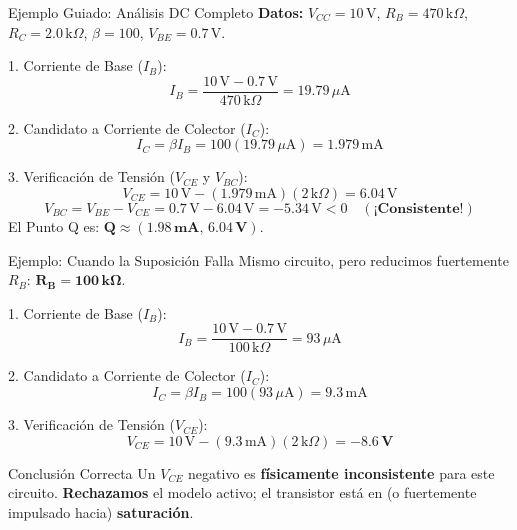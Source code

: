 \documentclass[aspectratio=169, table, xcdraw]{beamer}
\begin{document}
\begin{frame}{Ejemplo Guiado: Análisis DC Completo}
    \textbf{Datos:} $V_{CC}=10\,\text{V}$, $R_B=470\,\text{k}\Omega$, $R_C=2.0\,\text{k}\Omega$, $\beta=100$, $V_{BE}=0.7\,\text{V}$.
    
    \vspace{0.2cm}
    1. Corriente de Base ($I_B$):
    \begin{equation*}
        I_B = \frac{10\,\text{V} - 0.7\,\text{V}}{470\,\text{k}\Omega} = 19.79\,\mu\text{A}
    \end{equation*}
    
    2. Candidato a Corriente de Colector ($I_C$):
    \begin{equation*}
        I_C = \beta I_B = 100(19.79\,\mu\text{A}) = 1.979\,\text{mA}
    \end{equation*}
    
    3. Verificación de Tensión ($V_{CE}$ y $V_{BC}$):
    \begin{equation*}
        V_{CE} = 10\,\text{V} - (1.979\,\text{mA})(2\,\text{k}\Omega) = 6.04\,\text{V}
    \end{equation*}
    \begin{equation*}
        V_{BC} = V_{BE} - V_{CE} = 0.7\,\text{V} - 6.04\,\text{V} = -5.34\,\text{V} < 0 \quad \mathbf{(\text{¡Consistente!})}
    \end{equation*}
    El Punto Q es: $\mathbf{Q \approx (1.98\,\text{mA},\, 6.04\,\text{V})}$.
\end{frame}

\begin{frame}{Ejemplo: Cuando la Suposición Falla}
    Mismo circuito, pero reducimos fuertemente $R_B$: $\mathbf{R_B = 100\,\text{k}\Omega}$.
    
    \vspace{0.2cm}
    1. Corriente de Base ($I_B$):
    \begin{equation*}
        I_B = \frac{10\,\text{V} - 0.7\,\text{V}}{100\,\text{k}\Omega} = 93\,\mu\text{A}
    \end{equation*}
    
    2. Candidato a Corriente de Colector ($I_C$):
    \begin{equation*}
        I_C = \beta I_B = 100(93\,\mu\text{A}) = 9.3\,\text{mA}
    \end{equation*}
    
    3. Verificación de Tensión ($V_{CE}$):
    \begin{equation*}
        V_{CE} = 10\,\text{V} - (9.3\,\text{mA})(2\,\text{k}\Omega) = \mathbf{-8.6\,\text{V}}
    \end{equation*}
    
    \begin{alertblock}{Conclusión Correcta}
        Un $V_{CE}$ negativo es \textbf{físicamente inconsistente} para este circuito. \textbf{Rechazamos} el modelo activo; el transistor está en (o fuertemente impulsado hacia) \textbf{saturación}.
    \end{alertblock}
\end{frame}
\end{document}
